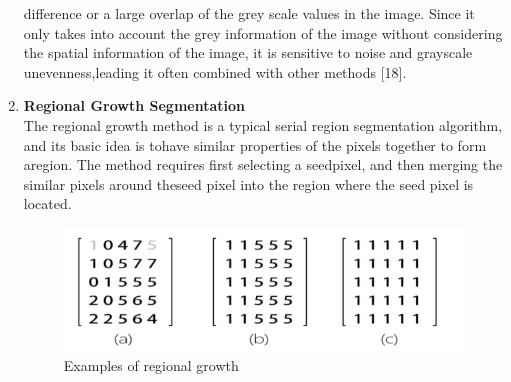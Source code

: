 \begin{enumerate}{}
                difference or a large overlap of the grey scale values in the image. Since it only takes into
                account the grey information of the image without considering the spatial information of the image,
                it is sensitive to noise and grayscale unevenness,leading it often combined with other methods [18].
                \item \textbf{Regional Growth Segmentation}\\
                The regional growth method is a typical serial region segmentation algorithm, and its basic idea
                is tohave similar properties of the pixels together to form aregion. The method requires first
                selecting a seedpixel, and then merging the similar pixels around theseed pixel into the region
                where the seed pixel is located.\\
                \vspace{1cm}
                \begin{figure}[h]
                        \centering
                        \includegraphics[width=12cm]{chapiter1/figures/regional.png}
                        \setlength{\fboxrule}{2pt}
                        \caption{Examples of regional growth}
                \end{figure}


\end{enumerate}
